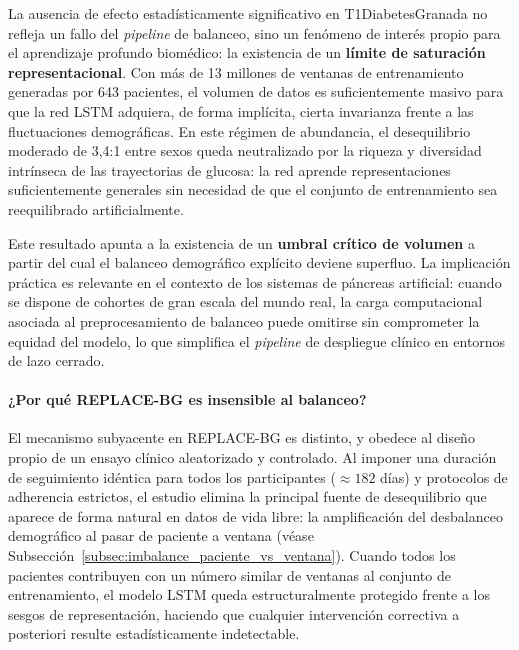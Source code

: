 La ausencia de efecto estadísticamente significativo en T1DiabetesGranada no
refleja un fallo del \textit{pipeline} de balanceo, sino un fenómeno de interés
propio para el aprendizaje profundo biomédico: la existencia de un
\textbf{límite de saturación representacional}. Con más de 13 millones de ventanas
de entrenamiento generadas por 643 pacientes, el volumen de datos es suficientemente
masivo para que la red LSTM adquiera, de forma implícita, cierta invarianza frente a
las fluctuaciones demográficas. En este régimen de abundancia, el desequilibrio
moderado de 3{,}4:1 entre sexos queda neutralizado por la riqueza y diversidad
intrínseca de las trayectorias de glucosa: la red aprende representaciones
suficientemente generales sin necesidad de que el conjunto de entrenamiento sea
reequilibrado artificialmente.

Este resultado apunta a la existencia de un \textbf{umbral crítico de volumen} a
partir del cual el balanceo demográfico explícito deviene superfluo. La implicación
práctica es relevante en el contexto de los sistemas de páncreas artificial: cuando
se dispone de cohortes de gran escala del mundo real, la carga computacional
asociada al preprocesamiento de balanceo puede omitirse sin comprometer la equidad
del modelo, lo que simplifica el \textit{pipeline} de despliegue clínico en
entornos de lazo cerrado.

\paragraph{¿Por qué REPLACE-BG es insensible al balanceo?}

El mecanismo subyacente en REPLACE-BG es distinto, y obedece al diseño propio de
un ensayo clínico aleatorizado y controlado. Al imponer una duración de seguimiento
idéntica para todos los participantes ($\approx 182$ días) y protocolos de
adherencia estrictos, el estudio elimina la principal fuente de desequilibrio que
aparece de forma natural en datos de vida libre: la amplificación del desbalanceo
demográfico al pasar de paciente a ventana (véase Subsección~\ref{subsec:imbalance_paciente_vs_ventana}).
Cuando todos los pacientes contribuyen con un número similar de ventanas al
conjunto de entrenamiento, el modelo LSTM queda estructuralmente protegido frente
a los sesgos de representación, haciendo que cualquier intervención correctiva
a posteriori resulte estadísticamente indetectable.

